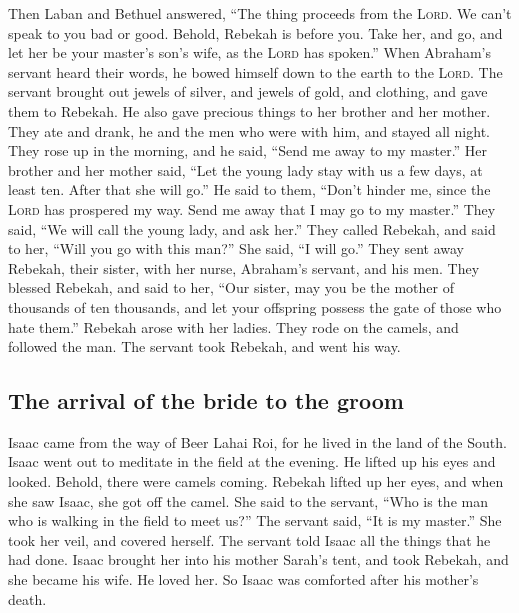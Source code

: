  Then Laban and Bethuel answered, ``The thing proceeds
from the \textsc{Lord}. We can't speak to you bad or good.
 Behold, Rebekah is before you. Take her, and go, and let
her be your master's son's wife, as the \textsc{Lord} has spoken.''
 When Abraham's servant heard their words, he bowed
himself down to the earth to the \textsc{Lord}.  The
servant brought out jewels of silver, and jewels of gold, and clothing,
and gave them to Rebekah. He also gave precious things to her brother
and her mother.  They ate and drank, he and the men who
were with him, and stayed all night. They rose up in the morning, and he
said, ``Send me away to my master.''  Her brother and her
mother said, ``Let the young lady stay with us a few days, at least ten.
After that she will go.''  He said to them, ``Don't
hinder me, since the \textsc{Lord} has prospered my way. Send me away
that I may go to my master.''  They said, ``We will call
the young lady, and ask her.''  They called Rebekah, and
said to her, ``Will you go with this man?'' She said, ``I will go.''
 They sent away Rebekah, their sister, with her nurse,
Abraham's servant, and his men.  They blessed Rebekah,
and said to her, ``Our sister, may you be the mother of thousands of ten
thousands, and let your offspring possess the gate of those who hate
them.''  Rebekah arose with her ladies. They rode on the
camels, and followed the man. The servant took Rebekah, and went his
way.

\hypertarget{the-arrival-of-the-bride-to-the-groom}{%
\subsection{The arrival of the bride to the
groom}\label{the-arrival-of-the-bride-to-the-groom}}

 Isaac came from the way of Beer Lahai Roi, for he lived
in the land of the South.  Isaac went out to meditate in
the field at the evening. He lifted up his eyes and looked. Behold,
there were camels coming.  Rebekah lifted up her eyes,
and when she saw Isaac, she got off the camel.  She said
to the servant, ``Who is the man who is walking in the field to meet
us?'' The servant said, ``It is my master.'' She took her veil, and
covered herself.  The servant told Isaac all the things
that he had done.  Isaac brought her into his mother
Sarah's tent, and took Rebekah, and she became his wife. He loved her.
So Isaac was comforted after his mother's death.

